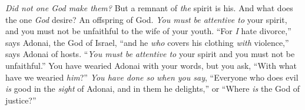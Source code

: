 \begin{biblechapter}
\verse \textit{Did not one God make them?} But a remnant of \textit{the} spirit is his. And what does the one \textit{God} desire? An offspring of God. \textit{You must be attentive to} your spirit, and you must not be unfaithful to the wife of your youth.
\verse “For \textit{I} hate divorce,” says Adonai, the God of Israel, “and he \textit{who} covers his clothing \textit{with} violence,” says Adonai of hosts. “\textit{You must be attentive to} your spirit and you must not be unfaithful.”
\verse You have wearied Adonai with your words, but you ask, “With what have we wearied \textit{him}?” \textit{You have done so} \textit{when you say}, “Everyone who does evil \textit{is} good in the \textit{sight} of Adonai, and in them he delights,” or “Where \textit{is} the God of justice?”
\end{biblechapter}

